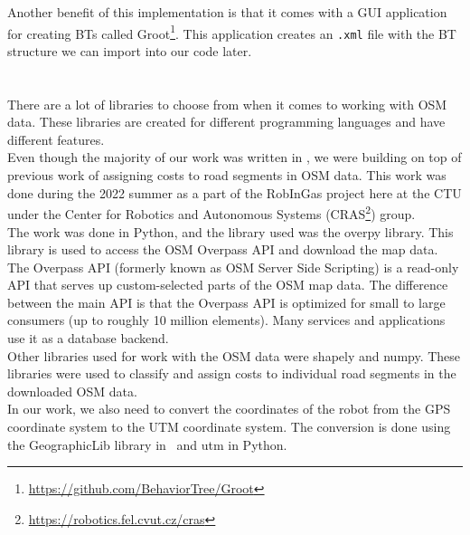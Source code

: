         Another benefit of this implementation is that it comes with a GUI application for creating BTs called Groot\footnote{\url{https://github.com/BehaviorTree/Groot}}. This application creates an \texttt{.xml} file with the BT structure we can import into our code later.\\\\
    \\
        There are a lot of libraries to choose from when it comes to working with OSM data. These libraries are created for different programming languages and have different features.\\
        Even though the majority of our work was written in \CC, we were building on top of previous work of assigning costs to road segments in OSM data. This work was done during the 2022 summer as a part of the RobInGas project here at the CTU under the Center for Robotics and Autonomous Systems (CRAS\footnote{\url{https://robotics.fel.cvut.cz/cras}}) group.\\
        The work was done in Python, and the library used was the overpy library. This library is used to access the OSM Overpass API and download the map data. The Overpass API (formerly known as OSM Server Side Scripting) is a read-only API that serves up custom-selected parts of the OSM map data. The difference between the main API is that the Overpass API is optimized for small to large consumers (up to roughly 10 million elements). Many services and applications use it as a database backend.\cite{Overpass}\\
        Other libraries used for work with the OSM data were shapely and numpy. These libraries were used to classify and assign costs to individual road segments in the downloaded OSM data.\\
        In our work, we also need to convert the coordinates of the robot from the GPS coordinate system to the UTM coordinate system. The conversion is done using the GeographicLib library in \CC\ and utm in Python.